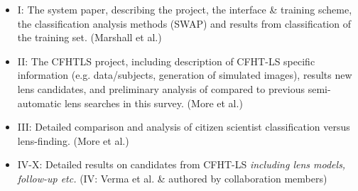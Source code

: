 \documentclass[a4paper]{article}
\begin{document}
\begin{itemize}
% 
%
%
\item \sw I: The system paper, describing the project, the interface \& training scheme, the classification analysis methods (SWAP) and results from classification of the training set. (Marshall et al.)
\item \sw II: The \sw CFHTLS project, including description of CFHT-LS specific information (e.g. data/subjects, generation of simulated images), results new lens candidates, and preliminary analysis of \sw compared to previous semi-automatic lens searches in this survey. (More et al.)
\item \sw III: Detailed comparison and analysis of citizen scientist classification versus lens-finding. (More et al.)
\item \sw IV-X: Detailed results on candidates from CFHT-LS \textit{including lens models, follow-up etc.} (IV: Verma et al. \& authored by collaboration members)
\end{itemize}
\end{document}
